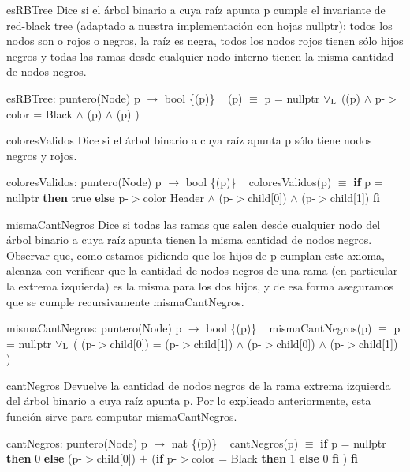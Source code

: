 \begin{DoxyParagraph}{es\+R\+B\+Tree}
Dice si el árbol binario a cuya raíz apunta p cumple el invariante de red-\/black tree (adaptado a nuestra implementación con hojas nullptr)\+: todos los nodos son o rojos o negros, la raíz es negra, todos los nodos rojos tienen sólo hijos negros y todas las ramas desde cualquier nodo interno tienen la misma cantidad de nodos negros.

es\+R\+B\+Tree\+: puntero(\+Node) p $\to$ bool \{(p)\} ~\newline
(p) $\equiv$ p = nullptr $\lor_{\rm L}$ ((p) $\land$ p-\/$>$color = Black $\land$ (p) $\land$ (p) )


\end{DoxyParagraph}
\begin{DoxyParagraph}{colores\+Validos}
Dice si el árbol binario a cuya raíz apunta p sólo tiene nodos negros y rojos.

colores\+Validos\+: puntero(\+Node) p $\to$ bool \{(p)\} ~\newline
colores\+Validos(p) $\equiv$ {\bfseries if} p = nullptr {\bfseries then} true {\bfseries else} p-\/$>$color  Header $\land$ (p-\/$>$child\mbox{[}0\mbox{]}) $\land$ (p-\/$>$child\mbox{[}1\mbox{]}) {\bfseries fi} 


\end{DoxyParagraph}
\begin{DoxyParagraph}{misma\+Cant\+Negros}
Dice si todas las ramas que salen desde cualquier nodo del árbol binario a cuya raíz apunta tienen la misma cantidad de nodos negros. Observar que, como estamos pidiendo que los hijos de p cumplan este axioma, alcanza con verificar que la cantidad de nodos negros de una rama (en particular la extrema izquierda) es la misma para los dos hijos, y de esa forma aseguramos que se cumple recursivamente misma\+Cant\+Negros.

misma\+Cant\+Negros\+: puntero(\+Node) p $\to$ bool \{(p)\} ~\newline
misma\+Cant\+Negros(p) $\equiv$ p = nullptr $\lor_{\rm L}$ ( (p-\/$>$child\mbox{[}0\mbox{]}) = (p-\/$>$child\mbox{[}1\mbox{]}) $\land$ (p-\/$>$child\mbox{[}0\mbox{]}) $\land$ (p-\/$>$child\mbox{[}1\mbox{]}) )


\end{DoxyParagraph}
\begin{DoxyParagraph}{cant\+Negros}
Devuelve la cantidad de nodos negros de la rama extrema izquierda del árbol binario a cuya raíz apunta p. Por lo explicado anteriormente, esta función sirve para computar misma\+Cant\+Negros.

cant\+Negros\+: puntero(\+Node) p $\to$ nat \{(p)\} ~\newline
cant\+Negros(p) $\equiv$ {\bfseries if} p = nullptr {\bfseries then} 0 {\bfseries else} (p-\/$>$child\mbox{[}0\mbox{]}) $+$ ({\bfseries if} p-\/$>$color = Black {\bfseries then} 1 {\bfseries else} 0 {\bfseries fi} ) {\bfseries fi} 


\end{DoxyParagraph}
